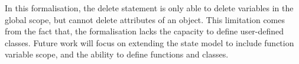 In this formalisation, the delete statement is only able to delete
variables in the global scope, but cannot delete attributes of an
object. This limitation comes from the fact that, the formalisation
lacks the capacity to define user-defined classes. Future work will
focus on extending the state model to include function variable scope,
and the ability to define functions and classes.
%
%
%
%
%
%
%
%
